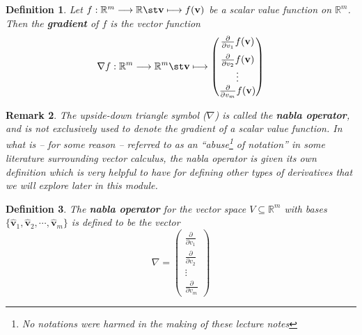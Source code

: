 \documentclass[12pt]{book}
\newcommand{\rbb}{\mathbb{R}}
\theoremstyle{definitionstyle}
\newtheorem{definition}{Definition}[section]
\newtheorem{remark}[definition]{Remark}
\numberwithin{equation}{section}
\begin{document}
\begin{definition}
    Let $\func[\mathbf{v}][f(\mathbf{v})]{f}{\rbb^m}{\rbb}$ be a scalar value function on $\rbb^m$. Then the \textbf{gradient} of $f$ is the vector function
	\begin{equation}
	    \func[\mathbf{v}][\begin{pmatrix} \frac{\partial}{\partial v_1}f(\mathbf{v}) \\[6pt] \frac{\partial}{\partial v_2}f(\mathbf{v}) \\ \vdots \\ \frac{\partial}{\partial v_m}f(\mathbf{v}) \end{pmatrix}]{\nabla f}{\rbb^m}{\rbb^m}
	\end{equation}
\end{definition}

\vspace{0.5cm}

\begin{remark}
    The upside-down triangle symbol ($\nabla$) is called the \textbf{nabla operator}, and is not exclusively used to denote the gradient of a scalar value function. In what is -- for some reason -- referred to as an ``abuse\footnote{No notations were harmed in the making of these lecture notes} of notation'' in some literature surrounding vector calculus, the nabla operator is given its own definition which is very helpful to have for defining other types of derivatives that we will explore later in this module.
\end{remark}

\vspace{0.5cm}

\begin{definition}
    The \textbf{nabla operator} for the vector space $V\subseteq\rbb^m$ with bases $\{\mathbf{\hat{v}}_1, \mathbf{\hat{v}}_2, \cdots, \mathbf{\hat{v}}_m\}$ is defined to be the vector
    \begin{equation}
	\nabla = \begin{pmatrix} \frac{\partial}{\partial v_1} \\[6pt] \frac{\partial}{\partial v_2} \\ \vdots \\ \frac{\partial}{\partial v_m} \end{pmatrix}
    \end{equation}
\end{definition}

\vspace{0.5cm}
\end{document}
